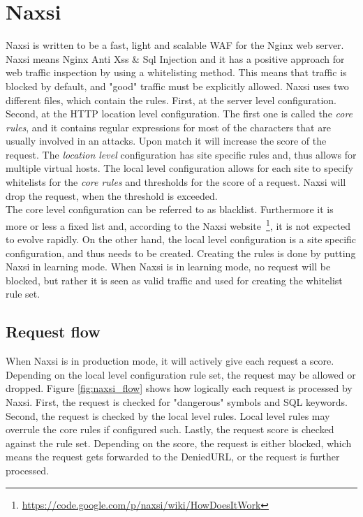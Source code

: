 \documentclass[Naxsi]{subfiles}
\begin{document}
\section{Naxsi}
\label{sec:Naxsi}
Naxsi is written to be a fast, light and scalable \ac{WAF} for the Nginx web server. Naxsi means Nginx Anti Xss \& Sql Injection and it has a positive approach for web traffic inspection by using a whitelisting method. This means that traffic is blocked by default, and "good" traffic must be explicitly allowed. Naxsi uses two different files, which contain the rules. First, at the server level configuration. Second, at the HTTP location level configuration. The first one is called the \emph{core rules}, and it contains regular expressions for most of the characters that are usually involved in an attacks. Upon match it will increase the score of the request. The \emph{location level} configuration has site specific rules and, thus allows for multiple virtual hosts. The local level configuration allows for each site to specify whitelists for the \emph{core rules} and thresholds for the score of a request. Naxsi will drop the request, when the threshold is exceeded.\\
The core level configuration can be referred to as blacklist. Furthermore it is more or less a fixed list and, according to the Naxsi website~\footnote{\url{https://code.google.com/p/naxsi/wiki/HowDoesItWork}}, it is not expected to evolve rapidly. On the other hand, the local level configuration is a site specific configuration, and thus needs to be created. Creating the rules is done by putting Naxsi in learning mode. When Naxsi is in learning mode, no request will be blocked, but rather it is seen as valid traffic and used for creating the whitelist rule set.

\subsection{Request flow}
When Naxsi is in production mode, it will actively give each request a score. Depending on the local level configuration rule set, the request may be allowed or dropped. Figure \ref{fig:naxsi_flow} shows how logically each request is processed by Naxsi. First, the request is checked for "dangerous" symbols and SQL keywords. Second, the request is checked by the local level rules. Local level rules may overrule the core rules if configured such. Lastly, the request score is checked against the rule set. Depending on the score, the request is either blocked, which means the request gets forwarded to the DeniedURL, or the request is further processed.
\end{document}
